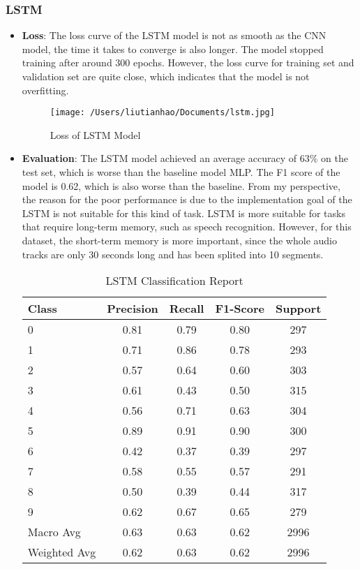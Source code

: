 \documentclass{article}
\begin{document}
\subsubsection{LSTM}
\begin{itemize}
  \item \textbf{Loss}: The loss curve of the LSTM model is not as smooth as the CNN model, the time it takes to converge is also longer. 
  The model stopped training after around 300 epochs. However, the loss curve for training set and validation set are quite close, which indicates that the model is not overfitting.
  \begin{figure}[h]
    \centering
    \texttt{[image: /Users/liutianhao/Documents/lstm.jpg]}
    \caption{Loss of LSTM Model}
  \end{figure}

  \item \textbf{Evaluation}: The LSTM model achieved an average accuracy of 63\% on the test set, which is worse than the baseline model MLP.
  The F1 score of the model is 0.62, which is also worse than the baseline. 
  From my perspective, the reason for the poor performance is due to the implementation goal of the LSTM is not suitable for this kind of task.
  LSTM is more suitable for tasks that require long-term memory, such as speech recognition. However, for this dataset, the short-term memory is more important, since 
  the whole audio tracks are only 30 seconds long and has been splited into 10 segments. 
  \begin{table}[h]
    \centering
    \caption{LSTM Classification Report}
    \begin{tabular}{lcccc}
        \toprule
        Class & Precision & Recall & F1-Score & Support \\
        \midrule
        0 & 0.81 & 0.79 & 0.80 & 297 \\
        1 & 0.71 & 0.86 & 0.78 & 293 \\
        2 & 0.57 & 0.64 & 0.60 & 303 \\
        3 & 0.61 & 0.43 & 0.50 & 315 \\
        4 & 0.56 & 0.71 & 0.63 & 304 \\
        5 & 0.89 & 0.91 & 0.90 & 300 \\
        6 & 0.42 & 0.37 & 0.39 & 297 \\
        7 & 0.58 & 0.55 & 0.57 & 291 \\
        8 & 0.50 & 0.39 & 0.44 & 317 \\
        9 & 0.62 & 0.67 & 0.65 & 279 \\
        \midrule
        Macro Avg & 0.63 & 0.63 & 0.62 & 2996 \\
        Weighted Avg & 0.62 & 0.63 & 0.62 & 2996 \\
        \bottomrule
    \end{tabular}
\end{table}
\end{itemize}
\end{document}
